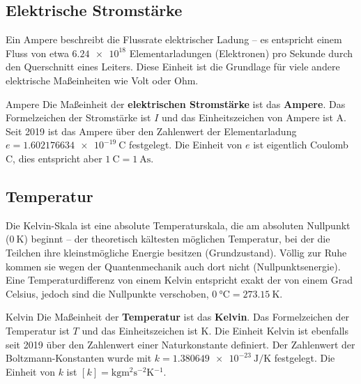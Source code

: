 \subsection{Elektrische Stromstärke}\label{subsec: SI-Stromstärke}
Ein Ampere beschreibt die Flussrate elektrischer Ladung -- es entspricht einem Fluss von etwa $\num{6.24e18}$ Elementarladungen (\zB Elektronen) pro Sekunde durch den Querschnitt eines Leiters. Diese Einheit ist die Grundlage für viele andere elektrische Maßeinheiten wie Volt oder Ohm.
\begin{importantbox}[]{Ampere}
Die Maßeinheit der \textbf{elektrischen Stromstärke} ist das \textbf{Ampere}. Das Formelzeichen der Stromstärke ist $I$ und das Einheitszeichen von Ampere ist \si{\ampere}.
\tcblower
Seit 2019 ist das Ampere über den Zahlenwert der Elementarladung $e = \SI{1.602176634e-19}{\coulomb}$ festgelegt.\footnotemark{} Die Einheit von $e$ ist eigentlich Coulomb \si{\coulomb}, dies entspricht aber $\SI{1}{\coulomb} = \SI{1}{\ampere\second}$.
\end{importantbox}

\subsection{Temperatur}\label{subsec: SI-Temperatur}
Die Kelvin-Skala ist eine absolute Temperaturskala, die am absoluten Nullpunkt ($\SI{0}{\kelvin}$) beginnt – der theoretisch kältesten möglichen Temperatur, bei der die Teilchen ihre kleinstmögliche Energie besitzen (Grundzustand). Völlig zur Ruhe kommen sie wegen der Quantenmechanik auch dort nicht (Nullpunktsenergie). Eine Temperaturdifferenz von einem Kelvin entspricht exakt der von einem Grad Celsius, jedoch sind die Nullpunkte verschoben, $\SI{0}{\celsius} = \SI{273.15}{\kelvin}$.
\begin{importantbox}[]{Kelvin}
Die Maßeinheit der \textbf{Temperatur} ist das \textbf{Kelvin}. Das Formelzeichen der Temperatur ist $T$ und das Einheitszeichen ist \si{\kelvin}.
\tcblower
Die Einheit Kelvin ist ebenfalls seit 2019 über den Zahlenwert einer Naturkonstante definiert. Der Zahlenwert der Boltzmann-Konstanten wurde mit $k = \SI{1.380649e-23}{\joule\per\kelvin}$ festgelegt.\footnotemark{} Die Einheit von $k$ ist $[k] = \si{\kilogram\meter^2\second^{-2}\kelvin^{-1}}$.
\end{importantbox}

